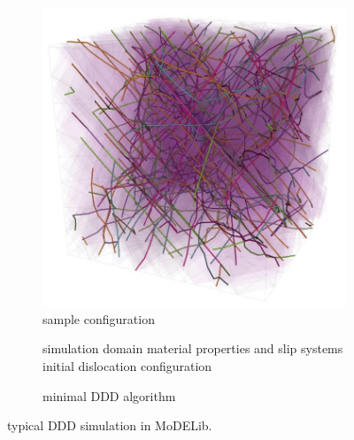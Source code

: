  \begin{figure}[h]
 \centering
  \begin{subfigure}{.48\textwidth}
 \includegraphics[width=\textwidth]{image_650}
 \caption{sample configuration}
  \label{DDDnutshellA}
\end{subfigure}
  \begin{subfigure}{.48\textwidth}
\begin{algorithm}[H]
\MyInit{}
 {
simulation domain\;
material properties and slip systems\;
initial dislocation configuration\;
 }
\end{algorithm}
 \caption{minimal DDD algorithm}
     \label{DDDnutshellB}
\end{subfigure}
  \caption{typical  DDD simulation in MoDELib. }
    \label{DDDnutshell}
 \end{figure}
 
